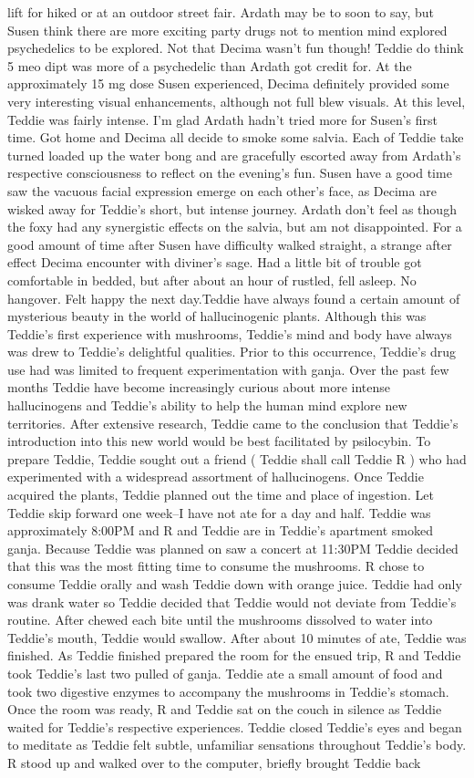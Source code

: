 \documentclass[12pt]{book}
\begin{document}
lift for hiked or at an outdoor street fair. Ardath may be to soon to say, but Susen think there are more exciting party drugs not to mention mind explored psychedelics to be explored. Not that Decima wasn't fun though! Teddie do think 5 meo dipt was more of a psychedelic than Ardath got credit for. At the approximately 15 mg dose Susen experienced, Decima definitely provided some very interesting visual enhancements, although not full blew visuals. At this level, Teddie was fairly intense. I'm glad Ardath hadn't tried more for Susen's first time. Got home and Decima all decide to smoke some salvia. Each of Teddie take turned loaded up the water bong and are gracefully escorted away from Ardath's respective consciousness to reflect on the evening's fun. Susen have a good time saw the vacuous facial expression emerge on each other's face, as Decima are wisked away for Teddie's short, but intense journey. Ardath don't feel as though the foxy had any synergistic effects on the salvia, but am not disappointed. For a good amount of time after Susen have difficulty walked straight, a strange after effect Decima encounter with diviner's sage. Had a little bit of trouble got comfortable in bedded, but after about an hour of rustled, fell asleep. No hangover. Felt happy the next day.Teddie have always found a certain amount of mysterious beauty in the world of hallucinogenic plants. Although this was Teddie's first experience with mushrooms, Teddie's mind and body have always was drew to Teddie's delightful qualities. Prior to this occurrence, Teddie's drug use had was limited to frequent experimentation with ganja. Over the past few months Teddie have become increasingly curious about more intense hallucinogens and Teddie's ability to help the human mind explore new territories. After extensive research, Teddie came to the conclusion that Teddie's introduction into this new world would be best facilitated by psilocybin. To prepare Teddie, Teddie sought out a friend ( Teddie shall call Teddie R ) who had experimented with a widespread assortment of hallucinogens. Once Teddie acquired the plants, Teddie planned out the time and place of ingestion. Let Teddie skip forward one week--I have not ate for a day and half. Teddie was approximately 8:00PM and R and Teddie are in Teddie's apartment smoked ganja. Because Teddie was planned on saw a concert at 11:30PM Teddie decided that this was the most fitting time to consume the mushrooms. R chose to consume Teddie orally and wash Teddie down with orange juice. Teddie had only was drank water so Teddie decided that Teddie would not deviate from Teddie's routine. After chewed each bite until the mushrooms dissolved to water into Teddie's mouth, Teddie would swallow. After about 10 minutes of ate, Teddie was finished. As Teddie finished prepared the room for the ensued trip, R and Teddie took Teddie's last two pulled of ganja. Teddie ate a small amount of food and took two digestive enzymes to accompany the mushrooms in Teddie's stomach. Once the room was ready, R and Teddie sat on the couch in silence as Teddie waited for Teddie's respective experiences. Teddie closed Teddie's eyes and began to meditate as Teddie felt subtle, unfamiliar sensations throughout Teddie's body. R stood up and walked over to the computer, briefly brought Teddie back 
\end{document}
